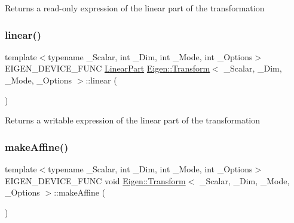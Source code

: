 \begin{DoxyReturn}{Returns}
a read-\/only expression of the linear part of the transformation 
\end{DoxyReturn}
\mbox{\label{class_eigen_1_1_transform_a540cef80cd714fa01d124536d39ac8da}} 
\subsubsection{\texorpdfstring{linear()}{linear()}\hspace{0.1cm}{\footnotesize\ttfamily [2/2]}}
{\footnotesize\ttfamily template$<$typename \+\_\+\+Scalar, int \+\_\+\+Dim, int \+\_\+\+Mode, int \+\_\+\+Options$>$ \\
E\+I\+G\+E\+N\+\_\+\+D\+E\+V\+I\+C\+E\+\_\+\+F\+U\+NC \mbox{\hyperlink{class_eigen_1_1_transform_a1441ef7d89d1f4cebd061db33b993cf2}{Linear\+Part}} \mbox{\hyperlink{class_eigen_1_1_transform}{Eigen\+::\+Transform}}$<$ \+\_\+\+Scalar, \+\_\+\+Dim, \+\_\+\+Mode, \+\_\+\+Options $>$\+::linear (\begin{DoxyParamCaption}{ }\end{DoxyParamCaption})\hspace{0.3cm}{\ttfamily [inline]}}

\begin{DoxyReturn}{Returns}
a writable expression of the linear part of the transformation 
\end{DoxyReturn}
\mbox{\label{class_eigen_1_1_transform_a18580c6c151bac89f03818164dd19632}} 
\subsubsection{\texorpdfstring{makeAffine()}{makeAffine()}}
{\footnotesize\ttfamily template$<$typename \+\_\+\+Scalar, int \+\_\+\+Dim, int \+\_\+\+Mode, int \+\_\+\+Options$>$ \\
E\+I\+G\+E\+N\+\_\+\+D\+E\+V\+I\+C\+E\+\_\+\+F\+U\+NC void \mbox{\hyperlink{class_eigen_1_1_transform}{Eigen\+::\+Transform}}$<$ \+\_\+\+Scalar, \+\_\+\+Dim, \+\_\+\+Mode, \+\_\+\+Options $>$\+::make\+Affine (\begin{DoxyParamCaption}{ }\end{DoxyParamCaption})\hspace{0.3cm}{\ttfamily [inline]}}

